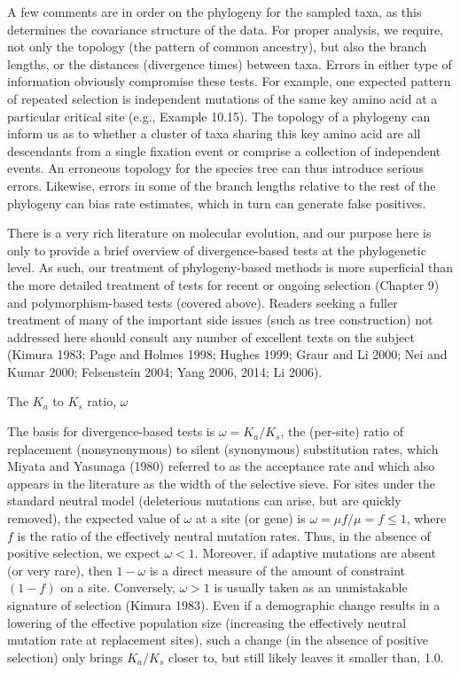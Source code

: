 \documentclass{article}
\begin{document}
A few comments are in order on the phylogeny for the sampled taxa, as this determines the covariance structure of the data. For proper analysis, we require, not only the topology (the pattern of common ancestry), but also the branch lengths, or the distances (divergence times) between taxa. Errors in either type of information obviously compromise these tests. For example, one expected pattern of repeated selection is independent mutations of the same key amino acid at a particular critical site (e.g., Example 10.15). The topology of a phylogeny can inform us as to whether a cluster of taxa sharing this key amino acid are all descendants from a single fixation event or comprise a collection of independent events. An erroneous topology for the species tree can thus introduce serious errors. Likewise, errors in some of the branch lengths relative to the rest of the phylogeny can bias rate estimates, which in turn can generate false positives.

There is a very rich literature on molecular evolution, and our purpose here is only to provide a brief overview of divergence-based tests at the phylogenetic level. As such, our treatment of phylogeny-based methods is more superficial than the more detailed treatment of tests for recent or ongoing selection (Chapter 9) and polymorphism-based tests (covered above). Readers seeking a fuller treatment of many of the important side issues (such as tree construction) not addressed here should consult any number of excellent texts on the subject (Kimura 1983; Page and Holmes 1998; Hughes 1999; Graur and Li 2000; Nei and Kumar 2000; Felsenstein 2004; Yang 2006, 2014; Li 2006).

The  $ K_{a} $ to  $ K_{s} $ ratio,  $ \omega $

The basis for divergence-based tests is  $ \omega = K_a/K_s $, the (per-site) ratio of replacement (nonsynonymous) to silent (synonymous) substitution rates, which Miyata and Yasunaga (1980) referred to as the acceptance rate and which also appears in the literature as the width of the selective sieve. For sites under the standard neutral model (deleterious mutations can arise, but are quickly removed), the expected value of  $ \omega $ at a site (or gene) is  $ \omega = \mu f/\mu = f \leq 1 $, where  $ f $ is the ratio of the effectively neutral mutation rates. Thus, in the absence of positive selection, we expect  $ \omega < 1 $. Moreover, if adaptive mutations are absent (or very rare), then  $ 1 - \omega $ is a direct measure of the amount of constraint  $ (1 - f) $ on a site. Conversely,  $ \omega > 1 $ is usually taken as an unmistakable signature of selection (Kimura 1983). Even if a demographic change results in a lowering of the effective population size (increasing the effectively neutral mutation rate at replacement sites), such a change (in the absence of positive selection) only brings  $ K_a/K_s $ closer to, but still likely leaves it smaller than, 1.0.
\end{document}

